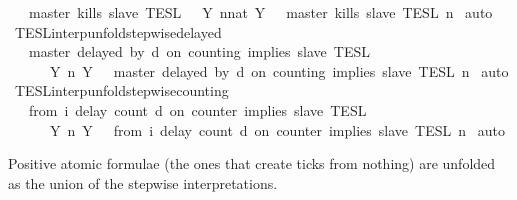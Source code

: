 \begin{isabellebody}
\ \ {\isacartoucheopen}{\isasymlbrakk}\ master\ kills\ slave\ {\isasymrbrakk}\isactrlsub T\isactrlsub E\isactrlsub S\isactrlsub L\ {\isacharequal}\ {\isasymInter}\ {\isacharbraceleft}Y{\isachardot}\ {\isasymexists}n{\isacharcolon}{\isacharcolon}nat{\isachardot}\ Y\ {\isacharequal}\ {\isasymlbrakk}\ master\ kills\ slave\ {\isasymrbrakk}\isactrlsub T\isactrlsub E\isactrlsub S\isactrlsub L\isactrlbsup {\isasymge}\ n\isactrlesup {\isacharbraceright}{\isacartoucheclose}\isanewline
%
\isadelimproof
%
\endisadelimproof
%
\isatagproof
{}\isamarkupfalse%
\ auto%
\endisatagproof
{\isafoldproof}%
%
\isadelimproof
\isanewline
%
\endisadelimproof
\isanewline
{}\isamarkupfalse%
\ TESL{\isacharunderscore}interp{\isacharunderscore}unfold{\isacharunderscore}stepwise{\isacharunderscore}delayed{\isacharcolon}\isanewline
\ \ {\isacartoucheopen}{\isasymlbrakk}\ master\ delayed\ by\ d\ on\ counting\ implies\ slave\ {\isasymrbrakk}\isactrlsub T\isactrlsub E\isactrlsub S\isactrlsub L\isanewline
\ \ \ \ {\isacharequal}\ {\isasymInter}\ {\isacharbraceleft}Y{\isachardot}\ {\isasymexists}n{\isachardot}\ Y\ {\isacharequal}\ {\isasymlbrakk}\ master\ delayed\ by\ d\ on\ counting\ implies\ slave\ {\isasymrbrakk}\isactrlsub T\isactrlsub E\isactrlsub S\isactrlsub L\isactrlbsup {\isasymge}\ n\isactrlesup {\isacharbraceright}{\isacartoucheclose}\isanewline
%
\isadelimproof
%
\endisadelimproof
%
\isatagproof
{}\isamarkupfalse%
\ auto%
\endisatagproof
{\isafoldproof}%
%
\isadelimproof
\isanewline
%
\endisadelimproof
\isanewline
{}\isamarkupfalse%
\ TESL{\isacharunderscore}interp{\isacharunderscore}unfold{\isacharunderscore}stepwise{\isacharunderscore}counting{\isacharcolon}\isanewline
\ \ {\isacartoucheopen}{\isasymlbrakk}\ from\ i\ delay\ count\ d\ on\ counter\ implies\ slave\ {\isasymrbrakk}\isactrlsub T\isactrlsub E\isactrlsub S\isactrlsub L\isanewline
\ \ \ \ {\isacharequal}\ {\isasymInter}\ {\isacharbraceleft}Y{\isachardot}\ {\isasymexists}n{\isachardot}\ Y\ {\isacharequal}\ {\isasymlbrakk}\ from\ i\ delay\ count\ d\ on\ counter\ implies\ slave\ {\isasymrbrakk}\isactrlsub T\isactrlsub E\isactrlsub S\isactrlsub L\isactrlbsup {\isasymge}\ n\isactrlesup {\isacharbraceright}{\isacartoucheclose}\isanewline
%
\isadelimproof
%
\endisadelimproof
%
\isatagproof
{}\isamarkupfalse%
\ auto%
\endisatagproof
{\isafoldproof}%
%
\isadelimproof
%
\endisadelimproof
%
\begin{isamarkuptext}%
Positive atomic formulae (the ones that create ticks from nothing) are unfolded
  as the union of the stepwise interpretations.%

\end{isamarkuptext}
\end{isabellebody}
